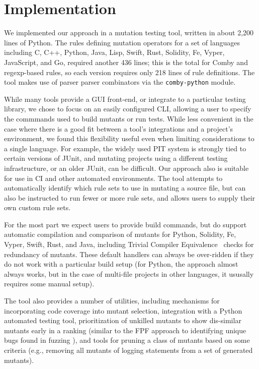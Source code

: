 \documentclass[acmsmall,screen,review,anonymous]{acmart}
\begin{document}
{\section{Implementation}
\label{sec:imp}

We implemented our approach in a mutation testing tool, written in
about 2,200 lines of Python.  The rules defining mutation operators
for a set of languages including C, C++, Python, Java, Lisp, Swift,
Rust, Solidity, Fe, Vyper, JavaScript, and Go, required another 436
lines; this is the total for Comby and regexp-based rules, so each
version requires only 218 lines of rule definitions.  The tool makes
use of parser parser combinators via the {\tt comby-python} module.

While many tools provide a GUI front-end, or integrate to a particular
testing library, we chose to focus on an easily configured CLI,
allowing a user to specify the commmands used to build mutants or
run tests.  While less convenient in the case where there is a good
fit between a tool's integrations and a project's environment, we
found this flexibility useful even when limiting considerations to a
single language.  For example, the widely used PIT system is strongly tied to
certain versions of JUnit, and mutating projects using a different
testing infrastructure, or an older JUnit, can be difficult.  Our
approach also is suitable for use in CI and other automated
environments.  The tool attempts to automatically identify which rule sets to use in
mutating a source file, but can also be instructed to run fewer or
more rule sets, and allows users to supply their own custom rule sets.

For the most part we expect users to provide build commands, but do
support automatic compilation and comparison of mutants for Python,
Solidity, Fe, Vyper, Swift, Rust, and Java, including Trivial Compiler
Equivalence~\cite{TCE} checks for redundancy of mutants.  These
default handlers can always be over-ridden if they do not work with a
particular build setup (for Python, the approach almost always works,
but in the case of multi-file projects in other languages, it ususally
requires some manual setup).

The tool also provides a number of utilities, including mechanisms for
incorporating code coverage into mutant selection, integration with a
Python automated testing tool, prioritization of unkilled mutants to
show dis-similar mutants early in a ranking (similar to the FPF
approach to identifying unique bugs found in fuzzing
\cite{10.1145/2491956.2462173}), and tools for pruning a class of
mutants based on some criteria (e.g., removing all mutants of logging
statements from a set of generated mutants).

}
\end{document}

